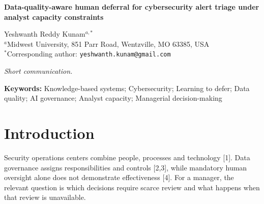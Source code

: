 \documentclass[11pt,letterpaper]{article}
\begin{document}
\doublespacing
\begin{center}{\large\bfseries Data-quality-aware human deferral for cybersecurity alert triage under analyst capacity constraints\par}
Yeshwanth Reddy Kunam$^{a,*}$\\
{\small $^a$Midwest University, 851 Parr Road, Wentzville, MO 63385, USA\\
$^*$Corresponding author: \texttt{yeshwanth.kunam@gmail.com}}
\end{center}
\noindent\textit{Short communication.}
\begin{abstract}Knowledge-based triage must allocate scarce analyst capacity when telemetry quality deteriorates. We investigate whether observable quality improves human deferral beyond detector probabilities, separating estimation from mandatory escalation and review volume. A frozen analysis plan evaluates label-independent field-family outages on verified, deduplicated UNSW-NB15 and temporally separated CICIDS2017 corpora, using two explicitly simulated reviewer scenarios. In the primary UNSW comparison at 20\% capacity, quality information reduced expected cost by 3.20\% relative to probability-only estimation, with identical review counts and mandatory ordering. The absolute reduction was 0.00686; the 95\% Monte Carlo interval was 0.00561-0.00811 over 20 experimental randomizations. These intervals condition on the fixed benchmark corpora. The CIC outage comparison did not corroborate the benefit, and confidence routing achieved lower mean cost there. Under severe outages, mandatory review covered every flow, leaving 80\% unresolved and making the automation-head contrast structurally zero. A capacity-constrained conformal comparator exposed a different balance between automatic errors and unresolved cases. The study identifies conditional estimation benefits and capacity-driven failure boundaries for AI governance; it does not establish analyst performance or production security effectiveness.\end{abstract}
\noindent\textbf{Keywords:} Knowledge-based systems; Cybersecurity; Learning to defer; Data quality; AI governance; Analyst capacity; Managerial decision-making

\section{Introduction}
Security operations centers combine people, processes and technology {[}1{]}. Data governance assigns responsibilities and controls {[}2,3{]}, while mandatory human oversight alone does not demonstrate effectiveness {[}4{]}. For a manager, the relevant question is which decisions require scarce review and what happens when that review is unavailable.
\end{document}
